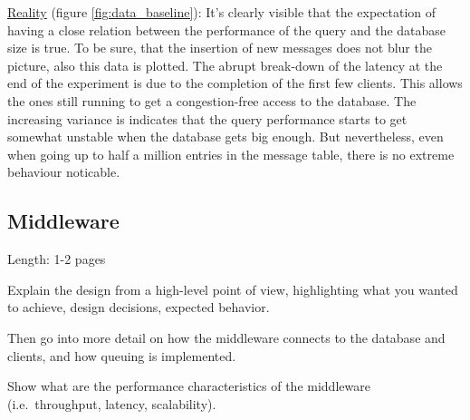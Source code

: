 \documentclass[11pt]{article}
\begin{document}
\newline\underline{Reality} (figure \ref{fig:data_baseline}): It's clearly visible that the expectation of having a close relation between the performance of the query and the database size is true. To be sure, that the insertion of new messages does not blur the picture, also this data is plotted. The abrupt break-down of the latency at the end of the experiment is due to the completion of the first few clients. This allows the ones still running to get a congestion-free access to the database. The increasing variance is indicates that the query performance starts to get somewhat unstable when the database gets big enough. But nevertheless, even when going up to half a million entries in the message table, there is no extreme behaviour noticable.

\subsection{Middleware}\label{sec:middleware}

Length: 1-2 pages

Explain the design from a high-level point of view, highlighting what
you wanted to achieve, design decisions, expected behavior.

Then go into more detail on how the middleware connects to the database
and clients, and how queuing is implemented.

Show what are the performance characteristics of the middleware
(i.e.~throughput, latency, scalability).
\end{document}

